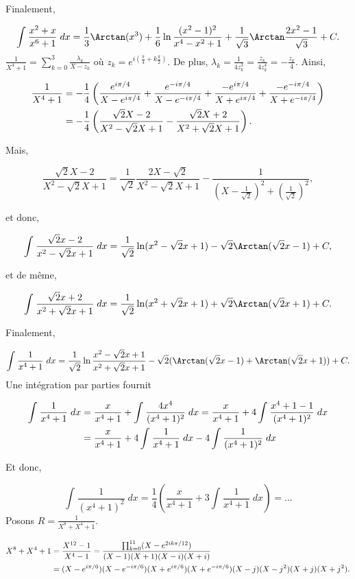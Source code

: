 {{Finalement,

$$\int_{}^{}\frac{x^2+x}{x^6+1}\;dx=\frac{1}{3}\Arctan(x^3)+\frac{1}{6}\ln\frac{(x^2-1)^2}{x^4-x^2+1}+\frac{1}{\sqrt{3}}\Arctan\frac{2x^2-1}{\sqrt{3}}+C.$$
$\frac{1}{X^4+1}=\sum_{k=0}^{3}\frac{\lambda_k}{X-z_k}$ où $z_k=e^{i(\frac{\pi}{4}+k\frac{\pi}{2})}$. De plus,
$\lambda_k=\frac{1}{4z_k^3}=\frac{z_k}{4z_k^4}=-\frac{z_k}{4}$. Ainsi,

\begin{align*}\ensuremath
\frac{1}{X^4+1}&=-\frac{1}{4}\left(\frac{e^{i\pi/4}}{X-e^{i\pi/4}}+\frac{e^{-i\pi/4}}{X-e^{-i\pi/4}}
+\frac{-e^{i\pi/4}}{X+e^{i\pi/4}}+\frac{-e^{-i\pi/4}}{X+e^{-i\pi/4}}\right)\\
 &=-\frac{1}{4}\left(\frac{\sqrt{2}X-2}{X^2-\sqrt{2}X+1}-\frac{\sqrt{2}X+2}{X^2+\sqrt{2}X+1}\right).
\end{align*}

Mais,

$$\frac{\sqrt{2}X-2}{X^2-\sqrt{2}X+1}=\frac{1}{\sqrt{2}}\frac{2X-\sqrt{2}}{X^2-\sqrt{2}X+1}-\frac{1}{(X-\frac{1}{\sqrt{2}})^2+(\frac{1}{\sqrt{2}})^2},$$

et donc,

$$\int_{}^{}\frac{\sqrt{2}x-2}{x^2-\sqrt{2}x+1}\;dx=\frac{1}{\sqrt{2}}\ln(x^2-\sqrt{2}x+1)-\sqrt{2}\Arctan(\sqrt{2}x-1)+C,$$

et de même,

$$\int_{}^{}\frac{\sqrt{2}x+2}{x^2+\sqrt{2}x+1}\;dx=\frac{1}{\sqrt{2}}\ln(x^2+\sqrt{2}x+1)+\sqrt{2}\Arctan(\sqrt{2}x+1)+C.$$

Finalement,

$$\int_{}^{}\frac{1}{x^4+1}\;dx=\frac{1}{\sqrt{2}}\ln\frac{x^2-\sqrt{2}x+1}{x^2+\sqrt{2}x+1}-\sqrt{2}(\Arctan(\sqrt{2}x-1)+\Arctan(\sqrt{2}x+1))+C.$$
Une intégration par parties fournit

\begin{align*}\ensuremath
\int_{}^{}\frac{1}{x^4+1}\;dx&=\frac{x}{x^4+1}+\int_{}^{}\frac{4x^4}{(x^4+1)^2}\;dx=\frac{x}{x^4+1}+4\int_{}^{}\frac{x^4+1-1}{(x^4+1)^2}\;dx\\
 &=\frac{x}{x^4+1}+4\int_{}^{}\frac{1}{x^4+1}\;dx-4\int_{}^{}\frac{1}{(x^4+1)^2}\;dx\\
\end{align*}

Et donc,

$$\int_{}^{}\frac{1}{(x^4+1)^2}\;dx=\frac{1}{4}(\frac{x}{x^4+1}+3\int_{}^{}\frac{1}{x^4+1}\;dx)=...$$
Posons $R=\frac{1}{X^8+X^4+1}$.

\begin{align*}\ensuremath
X^8+X^4+1&=\frac{X^{12}-1}{X^4-1}=\frac{\prod_{k=0}^{11}(X-e^{2ik\pi/12})}{(X-1)(X+1)(X-i)(X+i)}\\
 &=(X-e^{i\pi/6})(X-e^{-i\pi/6})(X+e^{i\pi/6})(X+e^{-i\pi/6})(X-j)(X-j^2)(X+j)(X+j^2).
\end{align*}

}}
